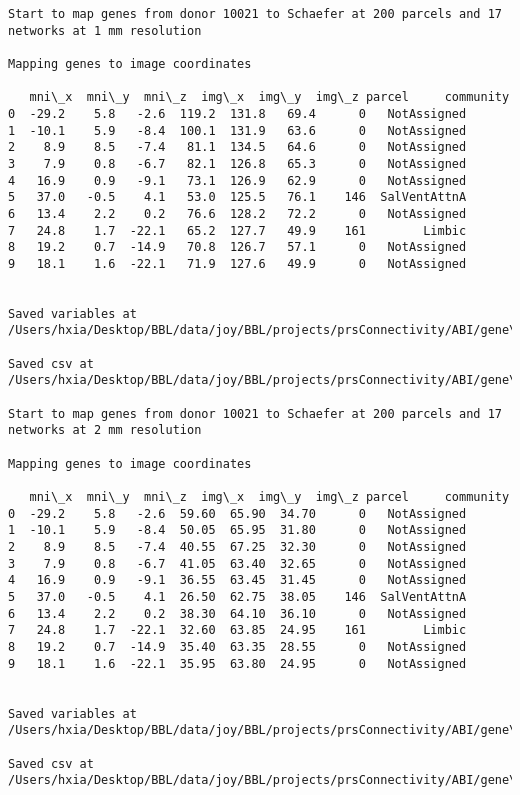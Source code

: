 \documentclass[11pt]{article}
\begin{document}
\begin{Verbatim}[commandchars=\\\{\}]
Start to map genes from donor 10021 to Schaefer at 200 parcels and 17 networks at 1 mm resolution

Mapping genes to image coordinates

   mni\_x  mni\_y  mni\_z  img\_x  img\_y  img\_z parcel     community
0  -29.2    5.8   -2.6  119.2  131.8   69.4      0   NotAssigned
1  -10.1    5.9   -8.4  100.1  131.9   63.6      0   NotAssigned
2    8.9    8.5   -7.4   81.1  134.5   64.6      0   NotAssigned
3    7.9    0.8   -6.7   82.1  126.8   65.3      0   NotAssigned
4   16.9    0.9   -9.1   73.1  126.9   62.9      0   NotAssigned
5   37.0   -0.5    4.1   53.0  125.5   76.1    146  SalVentAttnA
6   13.4    2.2    0.2   76.6  128.2   72.2      0   NotAssigned
7   24.8    1.7  -22.1   65.2  127.7   49.9    161        Limbic
8   19.2    0.7  -14.9   70.8  126.7   57.1      0   NotAssigned
9   18.1    1.6  -22.1   71.9  127.6   49.9      0   NotAssigned


Saved variables at /Users/hxia/Desktop/BBL/data/joy/BBL/projects/prsConnectivity/ABI/gene\_mapping/10021donor\_200Parcels\_17Network\_1mm.pkl

Saved csv at /Users/hxia/Desktop/BBL/data/joy/BBL/projects/prsConnectivity/ABI/gene\_mapping/10021donor\_200Parcels\_17Network\_1mm.csv

Start to map genes from donor 10021 to Schaefer at 200 parcels and 17 networks at 2 mm resolution

Mapping genes to image coordinates

   mni\_x  mni\_y  mni\_z  img\_x  img\_y  img\_z parcel     community
0  -29.2    5.8   -2.6  59.60  65.90  34.70      0   NotAssigned
1  -10.1    5.9   -8.4  50.05  65.95  31.80      0   NotAssigned
2    8.9    8.5   -7.4  40.55  67.25  32.30      0   NotAssigned
3    7.9    0.8   -6.7  41.05  63.40  32.65      0   NotAssigned
4   16.9    0.9   -9.1  36.55  63.45  31.45      0   NotAssigned
5   37.0   -0.5    4.1  26.50  62.75  38.05    146  SalVentAttnA
6   13.4    2.2    0.2  38.30  64.10  36.10      0   NotAssigned
7   24.8    1.7  -22.1  32.60  63.85  24.95    161        Limbic
8   19.2    0.7  -14.9  35.40  63.35  28.55      0   NotAssigned
9   18.1    1.6  -22.1  35.95  63.80  24.95      0   NotAssigned


Saved variables at /Users/hxia/Desktop/BBL/data/joy/BBL/projects/prsConnectivity/ABI/gene\_mapping/10021donor\_200Parcels\_17Network\_2mm.pkl

Saved csv at /Users/hxia/Desktop/BBL/data/joy/BBL/projects/prsConnectivity/ABI/gene\_mapping/10021donor\_200Parcels\_17Network\_2mm.csv


\end{Verbatim}
\end{document}
